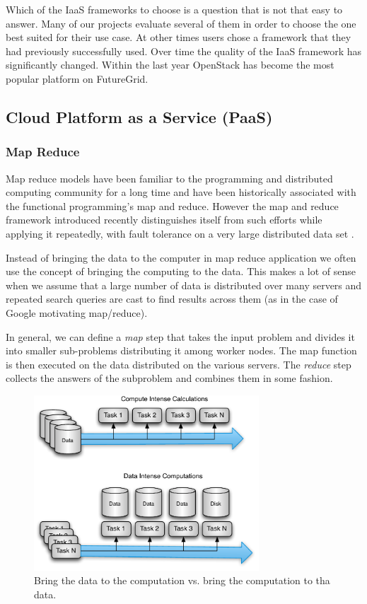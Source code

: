 \documentclass[graybox]{svmult}
\begin{document}
Which of the IaaS frameworks to choose is a question that is not that easy to answer. Many of our projects evaluate several of them in order to choose the one best suited for their use case. At other times users chose a framework that they had previously successfully used. Over time the quality of the IaaS framework has significantly changed. Within the last year OpenStack has become the most popular platform on FutureGrid.



\subsection{Cloud Platform as a Service (PaaS)}



\subsubsection{Map Reduce}

Map reduce models have been familiar to the programming and distributed computing community for a long time and have been historically associated with the functional programming's map and reduce. However the map and reduce framework introduced recently \cite{Dean:mapreduce} distinguishes itself from such efforts while applying it repeatedly, with fault tolerance on a very large distributed data set \cite{mapreduce-wikipedia}.

Instead of bringing the data to the computer in map reduce application we often use the concept of bringing the computing to the data. This makes a lot of sense when we assume that a large number of data is distributed over many servers and repeated search queries are cast to find results across them (as in the case of Google motivating map/reduce).

In general, we can define a {\em map} step that takes the input problem and divides it into smaller sub-problems distributing it among worker nodes. The map function is then executed on the data distributed on the various servers. The {\em reduce} step collects the answers of the subproblem and combines them in some fashion.

\begin{figure}[htb]
 \centering
   \includegraphics[width=0.75\textwidth]{images/mapreduce.pdf}
 \caption{Bring the data to the computation vs. bring the computation to tha data.}
\end{figure}
\end{document}
